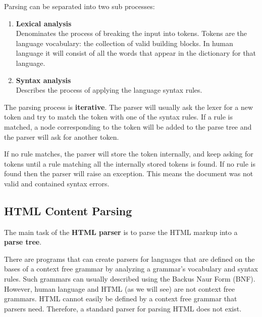 \documentclass[a4paper, justified, notoc]{tufte-handout} %
\begin{document}
Parsing can be separated into two sub processes: 
\begin{enumerate}
	\item \textbf{Lexical analysis} \\ Denominates the process of breaking the input into tokens. Tokens are the language vocabulary: the collection of valid building blocks. In human language it will consist of all the words that appear in the dictionary for that language.
	\item \textbf{Syntax analysis} \\ Describes the process of applying the language syntax rules.
\end{enumerate}

The parsing process is \textbf{iterative}. The parser will usually ask the lexer for a new token and try to match the token with one of the syntax rules. If a rule is matched, a node corresponding to the token will be added to the parse tree and the parser will ask for another token.

If no rule matches, the parser will store the token internally, and keep asking for tokens until a rule matching all the internally stored tokens is found. If no rule is found then the parser will raise an exception. This means the document was not valid and contained syntax errors.

\subsection{HTML Content Parsing} %
\label{sub:parsing_html_content}

The main task of the \textbf{HTML parser} is to parse the HTML markup into a \textbf{parse tree}.

There are programs that can create parsers for languages that are defined on the bases of a context free grammar by analyzing a grammar's vocabulary and syntax rules.
Such grammars can usually described using the Backus Naur Form (BNF). 
However, human language and HTML (as we will see) are not context free grammars. 
HTML cannot easily be defined by a context free grammar that parsers need.
Therefore, a standard parser for parsing HTML does not exist. 
\end{document}
